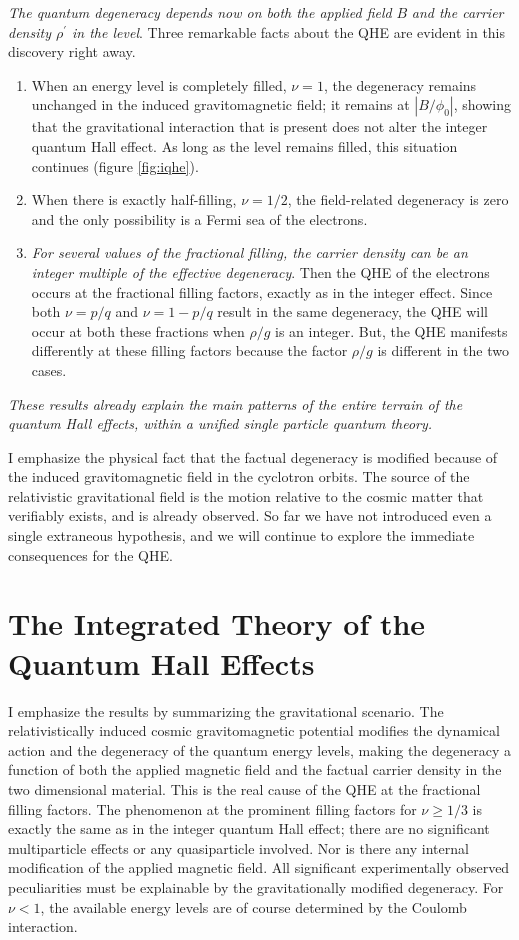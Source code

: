\documentclass[aps,preprint,12pt,tightenlines]{revtex4}%
\begin{document}
\emph{The quantum degeneracy depends now on
both the applied field} $B$ \emph{and the carrier density $\rho^\prime$ in the level}. Three
remarkable facts about the QHE are evident in this discovery right away.
\begin{enumerate}
	\item When an energy level is completely filled, $\nu=1$, the degeneracy remains
	unchanged in the induced gravitomagnetic field; it remains at $\left\vert
	B/\phi_{0}\right\vert $, showing that the gravitational interaction that is
	present does not alter the integer quantum Hall effect. As long as the level
	remains filled, this situation continues (figure \ref{fig:iqhe}).
	\item When there is
	exactly half-filling, $\nu=1/2$, the field-related degeneracy is zero and the
	only possibility is a Fermi sea of the electrons. 
	\item \emph{For several values of the fractional filling, the carrier density can be an integer multiple of the effective degeneracy}. Then the QHE of the electrons occurs at the
	fractional filling factors, exactly as in the integer effect. Since both
	$\nu=p/q$ and $\nu=1-p/q$ result in the same degeneracy, the QHE will occur at
	both these fractions when $\rho/g$ is an integer. But, the QHE manifests
	differently at these filling factors because the factor $\rho/g$ is different
	in the two cases. 
\end{enumerate} 
\emph{These results already explain the main patterns of the
entire terrain of the quantum Hall effects, within a unified single particle
quantum theory. }

I emphasize the physical fact that the factual degeneracy is modified because
of the induced gravitomagnetic field in the cyclotron orbits. The source of
the relativistic gravitational field is the motion relative to the cosmic
matter that verifiably exists, and is already observed. So far we have not
introduced even a single extraneous hypothesis, and we will continue to
explore the immediate consequences for the QHE.

\section{The Integrated Theory of the Quantum Hall Effects}
I emphasize the results by summarizing the gravitational scenario. The
relativistically induced cosmic gravitomagnetic potential modifies the
dynamical action and the degeneracy of the quantum energy levels, making the
degeneracy a function of both the applied magnetic field and the factual
carrier density in the two dimensional material. This is the real cause of the
QHE at the fractional filling factors. The phenomenon at the prominent filling
factors for $\nu\geq1/3$ is exactly the same as in the integer quantum Hall
effect; there are no significant multiparticle effects or any quasiparticle
involved. Nor is there any internal modification of the applied magnetic
field. All significant experimentally observed peculiarities must be
explainable by the gravitationally modified degeneracy. For $\nu<1$, the
available energy levels are of course determined by the Coulomb interaction.
\end{document}
